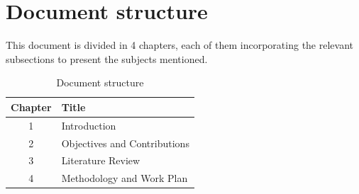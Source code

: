 \section{Document structure}

This document is divided in 4 chapters, each of them incorporating the relevant subsections to present the subjects mentioned. 

\begin{table}[!h]
	\label{tb:struct}
	\centering
	\caption{Document structure}
	\vspace{0.2em}
	\begin{tabular}{c|l}%
		\textbf{Chapter} & \textbf{Title}                    \\ \hline
		1       &                   Introduction             \\ \hline
		2       &                   Objectives and Contributions    \\ \hline
		3       &                   Literature Review    \\ \hline
		4       &                   Methodology and Work Plan       \\
	\end{tabular}
\end{table}
